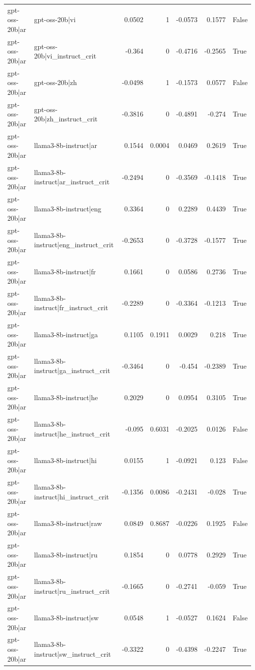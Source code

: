 \begin{table}
\begin{tabular}{l l r r r r l}
gpt-oss-20b|ar & gpt-oss-20b|vi & 0.0502 & 1 & -0.0573 & 0.1577 & False \\
gpt-oss-20b|ar & gpt-oss-20b|vi_instruct_crit & -0.364 & 0 & -0.4716 & -0.2565 & True \\
gpt-oss-20b|ar & gpt-oss-20b|zh & -0.0498 & 1 & -0.1573 & 0.0577 & False \\
gpt-oss-20b|ar & gpt-oss-20b|zh_instruct_crit & -0.3816 & 0 & -0.4891 & -0.274 & True \\
gpt-oss-20b|ar & llama3-8b-instruct|ar & 0.1544 & 0.0004 & 0.0469 & 0.2619 & True \\
gpt-oss-20b|ar & llama3-8b-instruct|ar_instruct_crit & -0.2494 & 0 & -0.3569 & -0.1418 & True \\
gpt-oss-20b|ar & llama3-8b-instruct|eng & 0.3364 & 0 & 0.2289 & 0.4439 & True \\
gpt-oss-20b|ar & llama3-8b-instruct|eng_instruct_crit & -0.2653 & 0 & -0.3728 & -0.1577 & True \\
gpt-oss-20b|ar & llama3-8b-instruct|fr & 0.1661 & 0 & 0.0586 & 0.2736 & True \\
gpt-oss-20b|ar & llama3-8b-instruct|fr_instruct_crit & -0.2289 & 0 & -0.3364 & -0.1213 & True \\
gpt-oss-20b|ar & llama3-8b-instruct|ga & 0.1105 & 0.1911 & 0.0029 & 0.218 & True \\
gpt-oss-20b|ar & llama3-8b-instruct|ga_instruct_crit & -0.3464 & 0 & -0.454 & -0.2389 & True \\
gpt-oss-20b|ar & llama3-8b-instruct|he & 0.2029 & 0 & 0.0954 & 0.3105 & True \\
gpt-oss-20b|ar & llama3-8b-instruct|he_instruct_crit & -0.095 & 0.6031 & -0.2025 & 0.0126 & False \\
gpt-oss-20b|ar & llama3-8b-instruct|hi & 0.0155 & 1 & -0.0921 & 0.123 & False \\
gpt-oss-20b|ar & llama3-8b-instruct|hi_instruct_crit & -0.1356 & 0.0086 & -0.2431 & -0.028 & True \\
gpt-oss-20b|ar & llama3-8b-instruct|raw & 0.0849 & 0.8687 & -0.0226 & 0.1925 & False \\
gpt-oss-20b|ar & llama3-8b-instruct|ru & 0.1854 & 0 & 0.0778 & 0.2929 & True \\
gpt-oss-20b|ar & llama3-8b-instruct|ru_instruct_crit & -0.1665 & 0 & -0.2741 & -0.059 & True \\
gpt-oss-20b|ar & llama3-8b-instruct|sw & 0.0548 & 1 & -0.0527 & 0.1624 & False \\
gpt-oss-20b|ar & llama3-8b-instruct|sw_instruct_crit & -0.3322 & 0 & -0.4398 & -0.2247 & True \\

\end{tabular}
\end{table}
